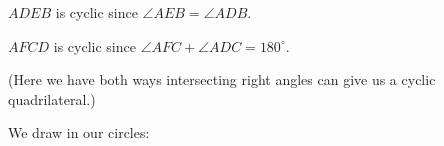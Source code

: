 















$ADEB$ is cyclic since $\angle AEB = \angle ADB.$

$AFCD$ is cyclic since $\angle AFC + \angle ADC = 180^\circ.$

(Here we have both ways intersecting right angles can give us a cyclic quadrilateral.)

We draw in our circles:




